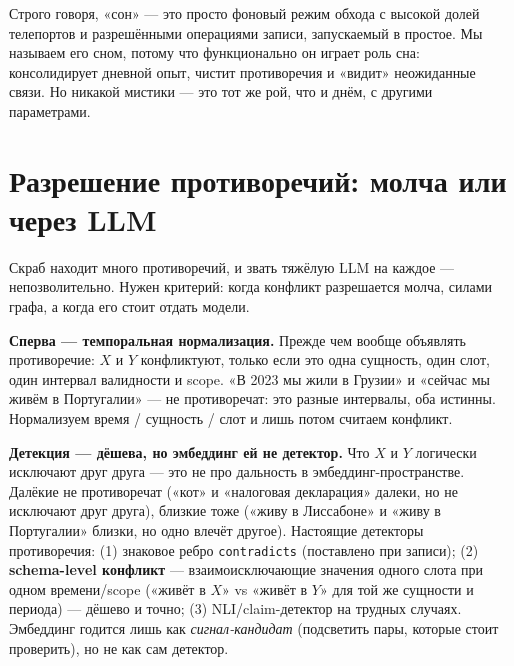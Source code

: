 \begin{intuition}
Строго говоря, «сон» --- это просто фоновый режим обхода с высокой долей
телепортов и разрешёнными операциями записи, запускаемый в простое. Мы
называем его сном, потому что функционально он играет роль сна:
консолидирует дневной опыт, чистит противоречия и «видит» неожиданные связи.
Но никакой мистики --- это тот же рой, что и днём, с другими параметрами.
\end{intuition}

\section{Разрешение противоречий: молча или через LLM}
\label{sec:conflict}

Скраб находит много противоречий, и звать тяжёлую LLM на каждое ---
непозволительно. Нужен критерий: когда конфликт разрешается молча, силами
графа, а когда его стоит отдать модели.

\smallskip\noindent\textbf{Сперва --- темпоральная нормализация.}
Прежде чем вообще объявлять противоречие: $X$ и $Y$ конфликтуют, только если
это одна сущность, один слот, один интервал валидности и scope. «В 2023 мы
жили в Грузии» и «сейчас мы живём в Португалии» --- не противоречат: это
разные интервалы, оба истинны. Нормализуем время / сущность / слот и лишь
потом считаем конфликт.

\smallskip\noindent\textbf{Детекция --- дёшева, но эмбеддинг ей не детектор.}
Что $X$ и $Y$ логически исключают друг друга --- это не про дальность в
эмбеддинг-пространстве. Далёкие не противоречат («кот» и «налоговая
декларация» далеки, но не исключают друг друга), близкие тоже («живу в
Лиссабоне» и «живу в Португалии» близки, но одно влечёт другое). Настоящие
детекторы противоречия: (1) знаковое ребро \texttt{contradicts} (поставлено
при записи); (2) \textbf{schema-level конфликт} --- взаимоисключающие значения
одного слота при одном времени/scope («живёт в $X$» vs «живёт в $Y$» для той
же сущности и периода) --- дёшево и точно; (3) NLI/claim-детектор на трудных
случаях. Эмбеддинг годится лишь как \emph{сигнал-кандидат} (подсветить пары,
которые стоит проверить), но не как сам детектор.

